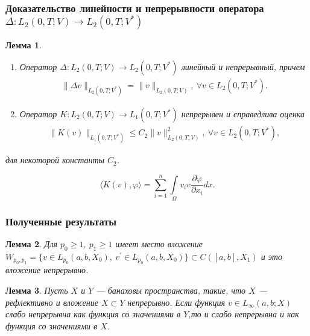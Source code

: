 \documentclass[10pt, pdf, hyperref={unicode}]{beamer}
\newtheorem{ru_lemma}{Лемма}
\renewenvironment{lemma}{\begin{ru_lemma}}{\end{ru_lemma}}
\begin{document}
  \begin{frame}
    \frametitle{Доказательство линейности и непрерывности оператора $\Delta:L_2 (0,T;V)\rightarrow L_2 (0,T;V^*)$}
    \begin{center}
      \begin{minipage}[h]{0.97\linewidth}
      \begin{lemma} ~\\
    \begin{enumerate}
        \item Оператор $\Delta: L_2(0, T; V) \rightarrow L_2(0, T; V^\ast)$ линейный и\linebreak
        непрерывный, причем
        \begin{equation}\label{eq:5.9}
            \begin{gathered}
                \| \Delta v \|_{L_2(0, T; V^\ast)} = \| v \|_{L_2(0, T; V)}, \ \forall v \in L_2(0, T; V^\ast).
            \end{gathered}
        \end{equation}
        \item Оператор $K: L_2(0, T; V) \rightarrow L_1(0, T; V^\ast)$ непрерывен и справедлива оценка
        \begin{equation}\label{eq:5.10}
            \begin{gathered}
                \| K(v) \|_{L_1(0, T; V^\ast)} \leqslant C_2\| v \|^2_{L_2(0, T;V)}, \ \forall v \in L_2(0, T; V^\ast),
            \end{gathered}
        \end{equation}
    \end{enumerate}
    для некоторой константы $C_2$.
\end{lemma}
$$\langle K(v),\varphi \rangle = \sum_{i=1}^{n}\int\limits_\Omega v_i v \frac{\partial \varphi}{\partial x_i}dx.$$
      \end{minipage}
    \end{center}
  \end{frame}


\begin{frame}
    \frametitle{Полученные результаты}
    \begin{center}
      \begin{minipage}[h]{0.97\linewidth}
        \begin{lemma}
          Для $p_0\ge 1, \ p_1\ge 1$ имеет место вложение\linebreak
          $W_{p_0,p_1}=\{v\in L_{p_0}(a,b,X_0), \ v^{\prime}\in L_{p_0}(a,b,X_0)\}\subset C([a,b],X_1)$
          и это вложение непрерывно.
        \end{lemma}
        \begin{lemma}
          Пусть $X$ и $Y$ --- банаховы пространства, такие, что $X$ --- рефлективно и вложение $X\subset Y$ непрерывно.
          Если функция $v\in L_{\infty}(a,b;X)$ слабо непрерывна как функция со значениями в $Y$,то и слабо непрерывна и как функция со значениями в $X$.
        \end{lemma}
      \end{minipage}
    \end{center}
  \end{frame}
\end{document}
